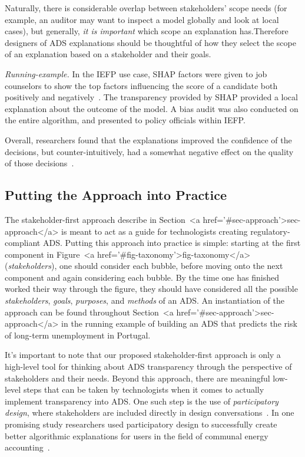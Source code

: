 \documentclass[sigconf, nonacm]{acmart}
\begin{document}
Naturally, there is considerable overlap between stakeholders' scope needs (for example, an auditor may want to inspect a model globally and look at local cases), but generally, \textit{it is important} which scope an explanation has.Therefore designers of ADS explanations should be thoughtful of how they select the scope of an explanation based on a stakeholder and their goals.

\emph{Running-example.} In the IEFP use case, SHAP factors were given to job counselors to show the top factors influencing the score of a candidate both positively and negatively~\cite{zejnilovic2020algorithmic}. The transparency provided by SHAP provided a local explanation about the outcome of the model. A bias audit was also conducted on the entire algorithm, and presented to policy officials within IEFP.

Overall, researchers found that the explanations improved the confidence of the decisions, but counter-intuitively, had a somewhat negative effect on the quality of those decisions~\cite{zejnilovic2020algorithmic}.

\subsection{Putting the Approach into Practice}
The stakeholder-first approach describe in Section~<a href='#sec-approach'>sec-approach</a> is meant to act as a guide for technologists creating regulatory-compliant ADS. Putting this approach into practice is simple: starting at the first component in Figure~<a href='#fig-taxonomy'>fig-taxonomy</a> (\emph{stakeholders}), one should consider each bubble, before moving onto the next component and again considering each bubble. By the time one has finished worked their way through the figure, they should have considered all the possible \emph{stakeholders}, \emph{goals}, \emph{purposes}, and \emph{methods} of an ADS. An instantiation of the approach can be found throughout Section~<a href='#sec-approach'>sec-approach</a> in the running example of building an ADS that predicts the risk of long-term unemployment in Portugal.

It's important to note that our proposed stakeholder-first approach is only a high-level tool for thinking about ADS transparency through the perspective of stakeholders and their needs. Beyond this approach, there are meaningful low-level steps that can be taken by technologists when it comes to actually implement transparency into ADS. One such step is the use of \emph{participatory design}, where stakeholders are included directly in design conversations~\cite{eiband2018bringing, cech2021tackling, aizenberg2020designing, gupta2020participatory}. In one promising study researchers used participatory design to successfully create better algorithmic explanations for users in the field of communal energy accounting~\cite{cech2021tackling}.
\end{document}
